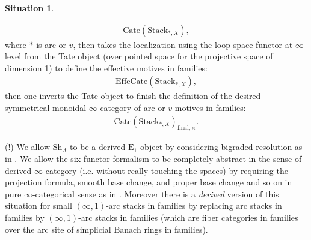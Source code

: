 \documentclass[12pt]{article}
\theoremstyle{definition}
\newtheorem{situation}{Situation}
\begin{document}
\begin{situation}
\begin{itemize}
\begin{align}
\mathrm{Cate}(\mathrm{Stack}_{\mathrm{*},X}),
\end{align}
where $*$ is arc or $v$, then takes the localization using the loop space functor at $\infty$-level from the Tate object (over pointed space for the projective space of dimension 1) to define the effective motives in families:
\begin{align}
\mathrm{Effe}\mathrm{Cate}(\mathrm{Stack}_{\mathrm{*},X}),
\end{align}
then one inverts the Tate object to finish the definition of the desired symmetrical monoidal $\infty$-category of arc or $v$-motives in families:
\begin{align}
\mathrm{Cate}(\mathrm{Stack}_{\mathrm{*},X})_{\mathrm{final},\times}.
\end{align}
\end{itemize}
(!) We allow $\mathrm{Sh}_A$ to be a derived $\mathrm{E}_1$-object by considering bigraded resolution as in \cite{3SI}. We allow the six-functor formalism to be completely abstract in the sense of derived $\infty$-category (i.e. without really touching the spaces) by requiring the projection formula, smooth base change, and proper base change and so on in pure $\infty$-categorical sense as in \cite{3CS1}. Moreover there is a \textit{derived} version of this situation for small $(\infty,1)$-arc stacks in families by replacing arc stacks in families by $(\infty,1)$-arc stacks in families (which are fiber categories in families over the arc site of simplicial Banach rings in families). 
\end{situation}
\end{document}
